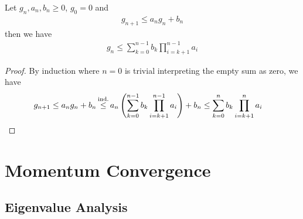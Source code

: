 \begin{lemma}\label{lem-appendix: discrete gronwall}
	Let \(g_n, a_n, b_n \ge 0\), \(g_0=0\) and
	\begin{align*}
		g_{n+1} \le a_n g_n + b_n
	\end{align*}
	then we have
	\begin{align*}
		g_n \le \sum_{k=0}^{n-1}b_k\prod_{i=k+1}^{n-1}a_i
	\end{align*}
\end{lemma}
\begin{proof}
	By induction where \(n=0\) is trivial interpreting the empty sum as zero, we have	
	\begin{align*}
		g_{n+1}
		&\le a_n g_n + b_n
		\xle{\text{ind.}} a_n \left(\sum_{k=0}^{n-1}b_k\prod_{i=k+1}^{n-1}a_i\right) + b_n
		\le \sum_{k=0}^{n}b_k\prod_{i=k+1}^{n}a_i
		\qedhere
	\end{align*}
\end{proof}

\section{Momentum Convergence}

\subsection{Eigenvalue Analysis}

